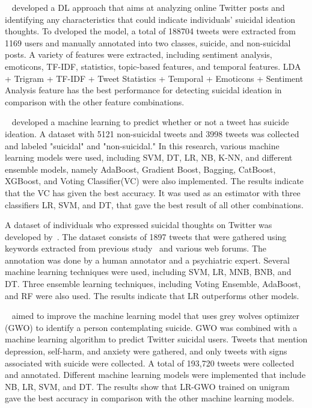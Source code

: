 \documentclass[11pt]{article}
\begin{document}
~\citet{9753295} developed a DL approach that aims at analyzing online Twitter posts and identifying any characteristics that could indicate individuals' suicidal ideation thoughts. To dveloped the model, a total of 188704 tweets were extracted from 1169 users and manually annotated into two classes, suicide, and non-suicidal posts. A variety of features were extracted, including sentiment analysis, emoticons, TF-IDF, statistics, topic-based features, and temporal features. LDA + Trigram + TF-IDF + Tweet Statistics + Temporal + Emoticons + Sentiment Analysis feature has the best performance for detecting suicidal ideation in comparison with the other feature combinations.%

~\cite{9528252} developed a machine learning to predict whether or not a tweet has suicide ideation. A dataset with 5121 non-suicidal tweets and 3998 tweets was collected and labeled "suicidal" and "non-suicidal." In this research, various machine learning models were used, including SVM, DT, LR, NB, K-NN, and different ensemble models, namely AdaBoost, Gradient Boost, Bagging, CatBoost, XGBoost, and Voting Classifier(VC) were also implemented. The results indicate that the VC has given the best accuracy. It was used as an estimator with three classifiers LR, SVM, and DT, that gave the best result of all other combinations.%

A dataset of individuals who expressed suicidal thoughts on Twitter was developed by~\cite{9388638}. The dataset consists of 1897 tweets that were gathered using keywords extracted from previous study~\cite{COLOMBO2016291} and various web forums. The annotation was done by a human annotator and a psychiatric expert. Several machine learning techniques were used, including SVM, LR, MNB, BNB, and DT. Three ensemble learning techniques, including Voting Ensemble, AdaBoost, and RF were also used. The results indicate that LR outperforms other models.%

~\cite{9678419} aimed to improve the machine learning model that uses grey wolves optimizer (GWO) to identify a person contemplating suicide. GWO was combined with a machine learning algorithm to predict Twitter suicidal users. Tweets that mention depression, self-harm, and anxiety were gathered, and only tweets with signs associated with suicide were collected. A total of 193,720 tweets were collected and annotated. Different machine learning models were implemented that include NB, LR, SVM, and DT. The results show that LR-GWO trained on unigram gave the best accuracy in comparison with the other machine learning models.   
\end{document}
